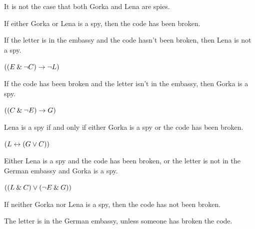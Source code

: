 \problempart
\label{pr.spies}
\vspace{-1em}
\begin{earg}
\item It is not the case that both Gorka and Lena are spies.
\item[] \smallskip

\item If either Gorka or Lena is a spy, then the code has been broken.
\item[] \smallskip

\noindent\begin{minipage}{0.99\textwidth}
\item If the letter is in the embassy and the code hasn't been broken, then Lena is not a spy.
\item[] $((E \mathbin{\&} {\neg} C) \rightarrow {\neg} L)$\smallskip
\end{minipage}

\item If the code has been broken and the letter isn't in the embassy, then Gorka is a spy.
\item[] $((C \mathbin{\&} {\neg} E) \rightarrow G)$\smallskip

\item Lena is a spy if and only if either Gorka is a spy or the code has been broken.
\item[] $(L \leftrightarrow (G \vee C))$\smallskip

\item Either Lena is a spy and the code has been broken, or the letter is not in the German embassy and Gorka is a spy.
\item[] $((L \mathbin{\&} C) \vee ({\neg} E \mathbin{\&} G))$\smallskip


\item If neither Gorka nor Lena is a spy, then the code has not been broken.
\item[] \smallskip

\item The letter is in the German embassy, unless someone has broken the code.
\item[] \smallskip


\end{earg}
